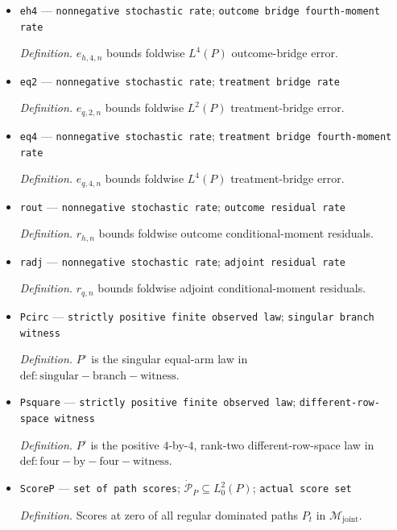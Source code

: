 \documentclass{article}
\begin{document}
\begin{itemize}
  \par\smallskip\noindent\emph{Definition.} \(e_{h,2,n}\) bounds foldwise \(L^2(P)\) outcome-bridge error.
  \item \texttt{eh4} --- \texttt{nonnegative stochastic rate}; \texttt{outcome bridge fourth-\allowbreak{}moment rate}
  \par\smallskip\noindent\emph{Definition.} \(e_{h,4,n}\) bounds foldwise \(L^4(P)\) outcome-bridge error.
  \item \texttt{eq2} --- \texttt{nonnegative stochastic rate}; \texttt{treatment bridge rate}
  \par\smallskip\noindent\emph{Definition.} \(e_{q,2,n}\) bounds foldwise \(L^2(P)\) treatment-bridge error.
  \item \texttt{eq4} --- \texttt{nonnegative stochastic rate}; \texttt{treatment bridge fourth-\allowbreak{}moment rate}
  \par\smallskip\noindent\emph{Definition.} \(e_{q,4,n}\) bounds foldwise \(L^4(P)\) treatment-bridge error.
  \item \texttt{rout} --- \texttt{nonnegative stochastic rate}; \texttt{outcome residual rate}
  \par\smallskip\noindent\emph{Definition.} \(r_{h,n}\) bounds foldwise outcome conditional-moment residuals.
  \item \texttt{radj} --- \texttt{nonnegative stochastic rate}; \texttt{adjoint residual rate}
  \par\smallskip\noindent\emph{Definition.} \(r_{q,n}\) bounds foldwise adjoint conditional-moment residuals.
  \item \texttt{Pcirc} --- \texttt{strictly positive finite observed law}; \texttt{singular branch witness}
  \par\smallskip\noindent\emph{Definition.} \(P^\circ\) is the singular equal-arm law in \(\mathrm{def:singular-branch-witness}\).
  \item \texttt{Psquare} --- \texttt{strictly positive finite observed law}; \texttt{different-\allowbreak{}row-\allowbreak{}space witness}
  \par\smallskip\noindent\emph{Definition.} \(P^\square\) is the positive \(4\)-by-\(4\), rank-two different-row-space law in \(\mathrm{def:four-by-four-witness}\).
  \item \texttt{ScoreP} --- \texttt{set of path scores}; \(\dot{\mathcal P}_P\subseteq L_0^2(P)\); \texttt{actual score set}
  \par\smallskip\noindent\emph{Definition.} Scores at zero of all regular dominated paths \(P_t\) in \(\mathcal M_{\mathrm{joint}}\).

\end{itemize}
\end{document}
